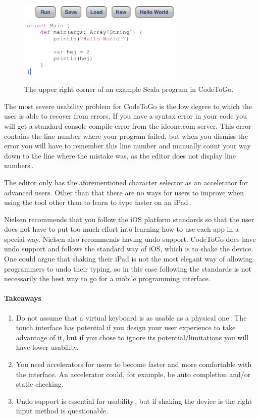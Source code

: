 \begin{figure}
	\centering
		\includegraphics[width=80mm]{diagrams/CodeToGo_screenshot.PNG}
	\caption{The upper right corner of an example Scala program in CodeToGo.}
\label{fig:CodeToGo_screenshot}
\end{figure}

The most severe usability problem for CodeToGo is the low degree to which the user is able to recover from errors. If you have a syntax error in your code you will get a standard console compile error from the ideone.com server. This error contains the line number where your program failed, but when you dismiss the error you will have to remember this line number and manually count your way down to the line where the mistake was, as the editor does not display line numbers\,\cite{nielsen1990heuristic}.

The editor only has the aforementioned character selector as an accelerator for advanced users. Other than that there are no ways for users to improve when using the tool other than to learn to type faster on an iPad\,\cite{nielsen1990heuristic}.

Nielsen  recommends that you follow the iOS platform standards so that the user does not have to put too much effort into learning how to use each app in a special way. Nielsen also recommends having undo support. CodeToGo does have undo support and follows the standard way of iOS, which is to shake the device. One could argue that shaking their iPad is not the most elegant way of allowing programmers to undo their typing, so in this case following the standards is not necessarily the best way to go for a mobile programming interface.

\paragraph{Takeaways}
\begin{enumerate}
	\item Do not assume that a virtual keyboard is as usable as a physical one\,\cite{nielsen2013mobile}. The touch interface has potential if you design your user experience to take advantage of it, but if you chose to ignore its potential/limitations you will have lower usability.
	\item You need accelerators for users to become faster and more comfortable with the interface. An accelerator could, for example, be auto completion and/or static checking.
	\item Undo support is essential for usability\,\cite{nielsen1990heuristic}, but if shaking the device is the right input method is questionable.
\end{enumerate}

